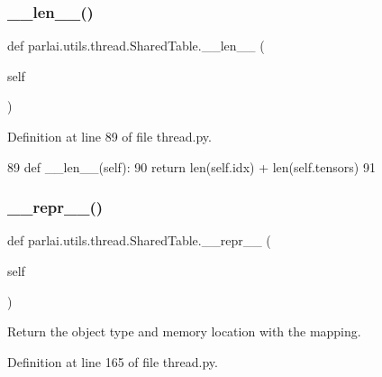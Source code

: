 \subsubsection{\texorpdfstring{\+\_\+\+\_\+len\+\_\+\+\_\+()}{\_\_len\_\_()}}
{\footnotesize\ttfamily def parlai.\+utils.\+thread.\+Shared\+Table.\+\_\+\+\_\+len\+\_\+\+\_\+ (\begin{DoxyParamCaption}\item[{}]{self }\end{DoxyParamCaption})}



Definition at line 89 of file thread.\+py.


\begin{DoxyCode}
89     \textcolor{keyword}{def }\_\_len\_\_(self):
90         \textcolor{keywordflow}{return} len(self.idx) + len(self.tensors)
91 
\end{DoxyCode}
\mbox{\label{classparlai_1_1utils_1_1thread_1_1SharedTable_af4577c8c954666ac3905a6215835bbd0}} 
\subsubsection{\texorpdfstring{\+\_\+\+\_\+repr\+\_\+\+\_\+()}{\_\_repr\_\_()}}
{\footnotesize\ttfamily def parlai.\+utils.\+thread.\+Shared\+Table.\+\_\+\+\_\+repr\+\_\+\+\_\+ (\begin{DoxyParamCaption}\item[{}]{self }\end{DoxyParamCaption})}

\begin{DoxyVerb}Return the object type and memory location with the mapping.
\end{DoxyVerb}
 

Definition at line 165 of file thread.\+py.


